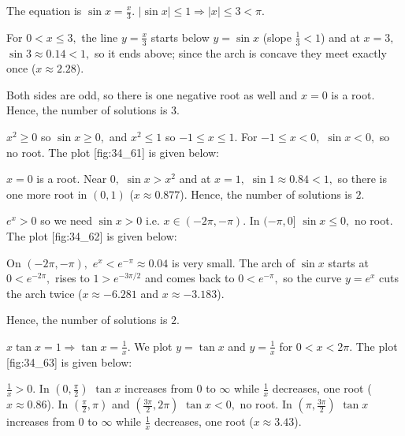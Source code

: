 \item The equation is $\sin x = \frac{x}{3}.$ $|\sin x|\leq 1\Rightarrow |x|\leq 3 < \pi.$

  For $0 < x\leq 3,$ the line $y = \frac{x}{3}$ starts below $y = \sin x$ (slope $\frac{1}{3} < 1$) and at $x = 3,$
  $\sin3\approx 0.14 < 1,$ so it ends above; since the arch is concave they meet exactly once ($x\approx 2.28$).

  Both sides are odd, so there is one negative root as well and $x = 0$ is a root. Hence, the number of solutions is
  $3.$

\item $x^2\geq 0$ so $\sin x\geq 0,$ and $x^2\leq 1$ so $-1\leq x\leq 1.$ For $-1\leq x < 0,$ $\sin x < 0,$ so no root.
  The plot [fig:34_61] is given below:

  \startplacefigure[title={Plot of $\sin x$ and $x^2$}, reference=fig:34_61]
    \externalfigure[34_61.pdf]
  \stopplacefigure

  $x = 0$ is a root. Near $0,$ $\sin x > x^2$ and at $x = 1,$ $\sin1\approx 0.84 < 1,$ so there is one more root in $(0,
  1)$ ($x\approx 0.877$). Hence, the number of solutions is $2.$

\item $e^x > 0$ so we need $\sin x > 0$ i.e. $x\in(-2\pi, -\pi).$ In $(-\pi, 0]$ $\sin x\leq 0,$ no root. The plot
  [fig:34_62] is given below:

  \startplacefigure[title={Plot of $e^x$ and $\sin x$}, reference=fig:34_62]
    \externalfigure[34_62.pdf]
  \stopplacefigure

  On $(-2\pi, -\pi),$ $e^x < e^{-\pi}\approx 0.04$ is very small. The arch of $\sin x$ starts at $0 < e^{-2\pi},$ rises
  to $1 > e^{-3\pi/2}$ and comes back to $0 < e^{-\pi},$ so the curve $y = e^x$ cuts the arch twice ($x\approx -6.281$
  and $x\approx -3.183$).

  Hence, the number of solutions is $2.$

\item $x\tan x = 1 \Rightarrow \tan x = \frac{1}{x}.$ We plot $y = \tan x$ and $y = \frac{1}{x}$ for $0 < x < 2\pi.$ The
  plot [fig:34_63] is given below:

  \startplacefigure[title={Plot of $\tan x$ and $\frac{1}{x}$}, reference=fig:34_63]
    \externalfigure[34_63.pdf]
  \stopplacefigure

  $\frac{1}{x} > 0.$ In $\left(0, \frac{\pi}{2}\right)$ $\tan x$ increases from $0$ to $\infty$ while $\frac{1}{x}$
  decreases, one root ($x\approx 0.86$). In $\left(\frac{\pi}{2}, \pi\right)$ and $\left(\frac{3\pi}{2}, 2\pi\right)$
  $\tan x < 0,$ no root. In $\left(\pi, \frac{3\pi}{2}\right)$ $\tan x$ increases from $0$ to $\infty$ while
  $\frac{1}{x}$ decreases, one root ($x\approx 3.43$).

